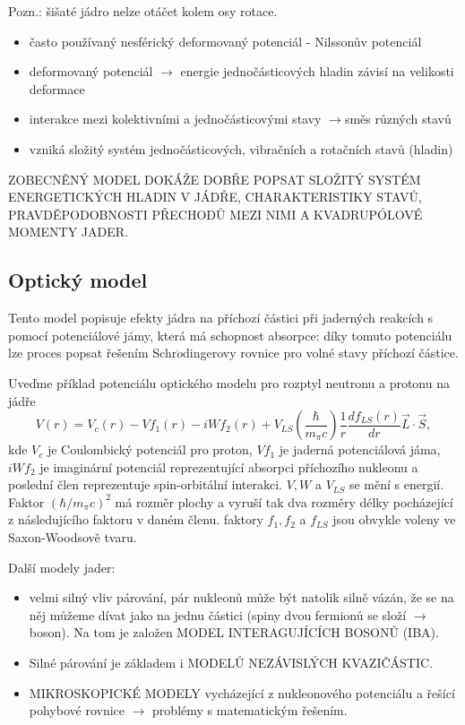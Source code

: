 \documentclass[../../main.tex]{subfiles}
\begin{document}
Pozn.: šišaté jádro nelze otáčet kolem osy rotace.
\begin{itemize}
	\item často používaný nesférický deformovaný potenciál - Nilssonův potenciál
	\item deformovaný potenciál $\rightarrow$ energie jednočásticových hladin závisí na velikosti deformace
	\item interakce mezi kolektivními a jednočásticovými stavy $\rightarrow$směs různých stavů
	\item vzniká složitý systém jednočásticových, vibračních a rotačních stavů (hladin)
\end{itemize}

ZOBECNĚNÝ MODEL DOKÁŽE DOBŘE POPSAT SLOŽITÝ SYSTÉM ENERGETICKÝCH HLADIN V JÁDŘE, CHARAKTERISTIKY STAVŮ, PRAVDĚPODOBNOSTI PŘECHODŮ MEZI NIMI A KVADRUPÓLOVÉ MOMENTY JADER.

\subsection{Optický model}

Tento model popisuje efekty jádra na příchozí částici při jaderných reakcích s pomocí potenciálové jámy, která má schopnost absorpce: díky tomuto potenciálu lze proces popsat řešením Schr$\ddot{o}$dingerovy rovnice pro volné stavy příchozí částice.

Uveďme příklad potenciálu optického modelu pro rozptyl neutronu a protonu na jádře
\begin{equation}
V(r) = V_c (r) - V f_1 (r) - iWf_2(r) + V_{LS} \left( \dfrac{\hbar}{m_{\pi} c} \right) \dfrac{1}{r} \dfrac{d f_{LS}(r)}{dr} \vec{L} \cdotp \vec{S}, 
\end{equation}
kde $V_c$ je Coulombický potenciál pro proton, $V f_1$ je jaderná potenciálová jáma, $i W f_2$ je imaginární potenciál reprezentující absorpci příchozího nukleonu a poslední člen reprezentuje spin-orbitální interakci. $V, W$ a $V_{LS}$ se mění s energií. Faktor $(\hbar /m_{\pi}c)^2$ má rozměr plochy a vyruší tak dva rozměry délky pocházející z následujícího faktoru v daném členu. faktory $f_1, f_2$ a $f_{LS}$ jsou obvykle voleny ve Saxon-Woodsově tvaru.


Další modely jader: 
\begin{itemize}
	\item velmi silný vliv párování, pár nukleonů může být natolik silně vázán, že se na něj můžeme  dívat jako na jednu částici (spiny dvou fermionů se složí $\rightarrow$ boson). Na tom je založen MODEL INTERAGUJÍCÍCH BOSONŮ (IBA).
	\item Silné párování je základem i MODELŮ NEZÁVISLÝCH KVAZIČÁSTIC.
	\item MIKROSKOPICKÉ MODELY vycházející z nukleonového potenciálu a řešící pohybové rovnice $\rightarrow$ problémy s matematickým řešením.
\end{itemize}	
  
\end{document}
